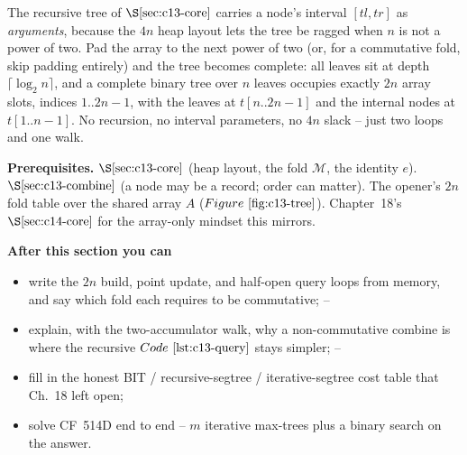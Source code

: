 \begin{topicintro}
The recursive tree of \(\secref{c13-core}\) carries a node's interval \([tl,tr]\)
as \emph{arguments}, because the \(4n\) heap layout lets the tree be ragged when
\(n\) is not a power of two.  Pad the array to the next power of two (or, for a
commutative fold, skip padding entirely) and the tree becomes complete: all
leaves sit at depth \(\lceil\log_2 n\rceil\), and a complete binary tree over \(n\)
leaves occupies exactly \(2n\) array slots, indices \(1..2n-1\), with the leaves
at \(t[n..2n{-}1]\) and the internal nodes at \(t[1..n{-}1]\).  No recursion, no
interval parameters, no \(4n\) slack -- just two loops and one walk.

\textbf{Prerequisites.} \(\secref{c13-core}\) (heap layout, the fold \(\mathcal{M}\),
the identity \(e\)).  \(\secref{c13-combine}\) (a node may be a record; order can
matter).  The opener's \(2n\) fold table over the shared array \(A\)
(\(\figref{c13-tree}\)).  Chapter~18's \(\secref{c14-core}\) for the array-only
mindset this mirrors.

\textbf{After this section you can}
\begin{itemize}[nosep]
  \item write the \(2n\) build, point update, and half-open query loops from
        memory, and say which fold each requires to be commutative; \hfill{}--
  \item explain, with the two-accumulator walk, why a non-commutative combine is
        where the recursive \(\coderef{c13-query}\) stays simpler; \hfill{}--
  \item fill in the honest BIT / recursive-segtree / iterative-segtree cost table
        that Ch.~18 left open; \hfill{}
  \item solve CF~514D end to end -- \(m\) iterative max-trees plus a binary search
        on the answer. \hfill{}
\end{itemize}
\end{topicintro}

